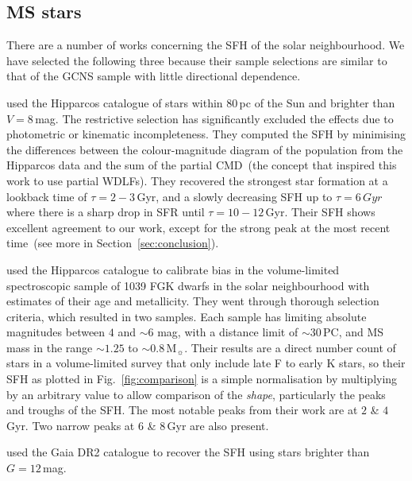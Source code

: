 \documentclass[fleqn,usenatbib]{mnras}
\begin{document}
\subsection{MS stars}
There are a number of works concerning the SFH of the solar neighbourhood. We
have selected the following three because their sample selections are similar
to that of the GCNS sample with little directional dependence.

\citet{2006A&A...459..783C} used the Hipparcos catalogue of stars within 80\,pc
of the Sun and brighter than $V=8$\,mag. The restrictive selection has
significantly excluded the effects due to photometric or kinematic
incompleteness. They computed the SFH by minimising the differences between the
colour-magnitude diagram of the population from the Hipparcos data and the
sum of the partial CMD~(the concept that inspired this work to use partial
WDLFs). They recovered the strongest star formation at a lookback time of
$\tau=2-3$\,Gyr, and a slowly decreasing SFH up to $\tau=6\,Gyr$ where there is
a sharp drop in SFR until $\tau=10-12$\,Gyr. Their SFH shows excellent agreement
to our work, except for the strong peak at the most recent time~(see more in
Section~\ref{sec:conclusion}).

\citet{2007ApJ...665..767R} used the Hipparcos catalogue to calibrate
bias in the \citep{2005ApJS..159..141V} volume-limited spectroscopic
sample of 1039 FGK dwarfs in the solar neighbourhood with estimates of
their age and metallicity. They went through thorough selection criteria,
which resulted in two samples. Each sample has limiting absolute magnitudes
between $4$ and $\sim$6 mag, with a distance limit of $\sim$30\,PC, and MS mass
in the range $\sim1.25$ to $\sim0.8$\,M$_{\sun}$. Their results are a direct
number count of stars in a volume-limited survey that only include late F to
early K stars, so their SFH as plotted in Fig.~\ref{fig:comparison} is a simple
normalisation by multiplying by an arbitrary value to allow comparison of the
\textit{shape}, particularly the peaks and troughs of the SFH. The most notable
peaks from their work are at $2$ \& $4$\,Gyr. Two narrow peaks at $6$ \&
$8$\,Gyr are also present.

\citet{2019A&A...624L...1M} used the Gaia DR2 catalogue to recover the SFH
using stars brighter than $G=12$\,mag.
\end{document}
